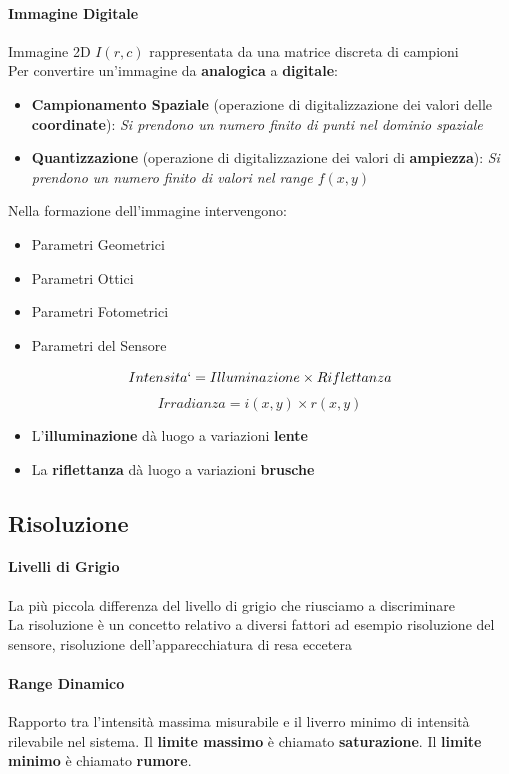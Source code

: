 \documentclass[12pt]{article}
\begin{document}
\paragraph{Immagine Digitale} Immagine 2D $I(r,c)$ rappresentata da una matrice discreta di campioni
\\[12pt]Per convertire un'immagine da \textbf{analogica} a \textbf{digitale}:
\begin{itemize}
    \item \textbf{Campionamento Spaziale} (operazione di digitalizzazione dei valori delle \textbf{coordinate}): \textit{Si prendono un numero finito di punti nel dominio spaziale}
    \item \textbf{Quantizzazione} (operazione di digitalizzazione dei valori di \textbf{ampiezza}): \textit{Si prendono un numero finito di valori nel range $f(x,y)$}
\end{itemize}
Nella formazione dell'immagine intervengono:
\begin{itemize}
    \item Parametri Geometrici
    \item Parametri Ottici
    \item Parametri Fotometrici
    \item Parametri del Sensore
\end{itemize}
$$Intensita` = Illuminazione \times Riflettanza$$
$$Irradianza = i(x,y) \times r(x,y)$$
\begin{itemize}
    \item L'\textbf{illuminazione} dà luogo a variazioni \textbf{lente}
    \item La \textbf{riflettanza} dà luogo a variazioni \textbf{brusche}
\end{itemize}
\subsection{Risoluzione}
\paragraph{Livelli di Grigio} La più piccola differenza del livello di grigio che riusciamo a discriminare
\\[12pt]
La risoluzione è un concetto relativo a diversi fattori ad esempio risoluzione del sensore, risoluzione dell'apparecchiatura di resa eccetera
\paragraph{Range Dinamico} Rapporto tra l'intensità massima misurabile e il liverro minimo di intensità rilevabile nel sistema. Il \textbf{limite massimo} è chiamato \textbf{saturazione}. Il \textbf{limite minimo} è chiamato \textbf{rumore}.
\newpage
\end{document}

